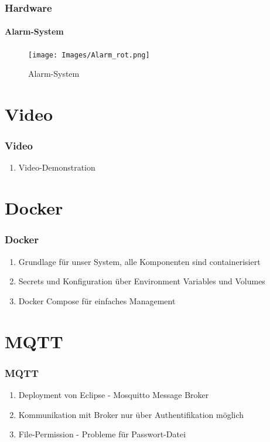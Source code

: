 \documentclass[]{beamer}
\begin{document}
\begin{frame}
	\frametitle{Hardware}
	\framesubtitle{Alarm-System}
	\begin{figure}
		\centering
		\begin{minipage}[t]{1\textwidth}
			\centering
			\texttt{[image: Images/Alarm\_rot.png]}
		\end{minipage}
		\caption{Alarm-System}
		\label{fig:slarm_system}
	\end{figure}
\end{frame}

\section{Video}

\begin{frame}
	\frametitle{Video}
	\begin{enumerate}
		\item Video-Demonstration
	\end{enumerate}
\end{frame}


\section{Docker}
\begin{frame}
	\frametitle{Docker}
	\begin{enumerate}
		\item Grundlage für unser System, alle Komponenten sind containerisiert
		\item Secrets und Konfiguration über Environment Variables und Volumes
		\item Docker Compose für einfaches Management
	\end{enumerate}
\end{frame}


\section{MQTT}
\begin{frame}
	\frametitle{MQTT}
	\begin{enumerate}
    \item Deployment von Eclipse - Mosquitto Message Broker 
    \item Kommunikation mit Broker nur über Authentifikation möglich
    \item File-Permission - Probleme für Passwort-Datei 
	\end{enumerate}
\end{frame}
\end{document}
